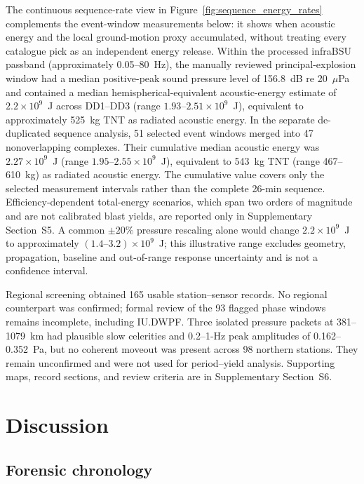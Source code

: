 \documentclass[]{seismica}
\begin{document}
The continuous sequence-rate view in
Figure~\ref{fig:sequence_energy_rates} complements the event-window
measurements below: it shows when acoustic energy and the local ground-motion
proxy accumulated, without treating every catalogue pick as an independent
energy release. Within the processed infraBSU passband (approximately
0.05--80~Hz), the manually reviewed principal-explosion window had a median positive-peak sound
pressure level of 156.8~dB re 20~$\mu$Pa and contained a median
hemispherical-equivalent acoustic-energy estimate of $2.2\times10^9$~J across DD1--DD3
(range $1.93$--$2.51\times10^9$~J), equivalent to approximately 525~kg TNT as
radiated acoustic energy. In the separate de-duplicated sequence analysis,
51 selected event windows merged into 47 nonoverlapping complexes. Their
cumulative median acoustic energy was $2.27\times10^9$~J
(range $1.95$--$2.55\times10^9$~J), equivalent to 543~kg TNT
(range 467--610~kg) as radiated acoustic energy. The cumulative value covers
only the selected measurement intervals rather than the complete 26-min
sequence. Efficiency-dependent total-energy scenarios, which span two orders
of magnitude and are not calibrated blast yields, are reported only in
Supplementary Section~S5. A common $\pm20\%$ pressure rescaling alone would
change $2.2\times10^9$~J to approximately $(1.4\text{--}3.2)\times10^9$~J;
this illustrative range excludes geometry, propagation, baseline and
out-of-range response uncertainty and is not a confidence interval.

Regional screening obtained 165 usable station--sensor records. No regional
counterpart was confirmed; formal review of the 93 flagged phase windows
remains incomplete, including IU.DWPF. Three isolated pressure
packets at 381--1079~km had plausible slow celerities and 0.2--1-Hz peak
amplitudes of 0.162--0.352~Pa, but no coherent moveout was present across 98
northern stations. They remain unconfirmed and were not used for period--yield
analysis. Supporting maps, record sections, and review criteria are in
Supplementary Section~S6.

\FloatBarrier

\section{Discussion}
\label{sec:discussion}

\subsection{Forensic chronology}
\end{document}
